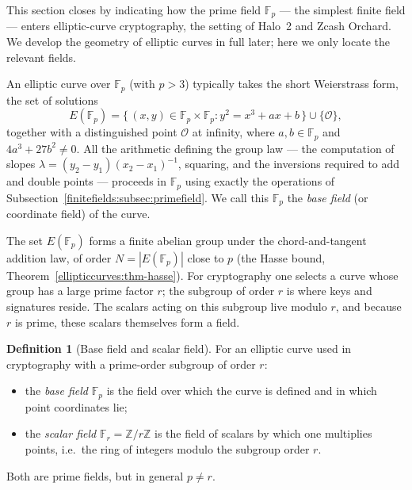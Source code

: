 \documentclass[11pt,a4paper]{article}
\theoremstyle{definition}
\newtheorem{definition}[theorem]{Definition}
\theoremstyle{remark}
\newcommand{\Z}{\ensuremath{\mathbb{Z}}}
\newcommand{\Fp}{\ensuremath{\mathbb{F}_{p}}}
\newcommand{\Fr}{\ensuremath{\mathbb{F}_{r}}}
\begin{document}
This section closes by indicating how the prime field \(\Fp\) — the simplest finite field — enters elliptic-curve cryptography, the setting of Halo~2 and Zcash Orchard. We develop the geometry of elliptic curves in full later; here we only locate the relevant fields.

An elliptic curve over \(\Fp\) (with \(p > 3\)) typically takes the short Weierstrass form, the set of solutions
\[
  E(\Fp) = \{\, (x, y) \in \Fp \times \Fp : y^2 = x^3 + ax + b \,\} \cup \{\mathcal O\},
\]
together with a distinguished point \(\mathcal O\) at infinity, where \(a, b \in \Fp\) and \(4a^3 + 27b^2 \neq 0\). All the arithmetic defining the group law — the computation of slopes \(\lambda = (y_2 - y_1)(x_2 - x_1)^{-1}\), squaring, and the inversions required to add and double points — proceeds in \(\Fp\) using exactly the operations of Subsection~\ref{finitefields:subsec:primefield}. We call this \(\Fp\) the \emph{base field} (or coordinate field) of the curve.

The set \(E(\Fp)\) forms a finite abelian group under the chord-and-tangent addition law, of order \(N = |E(\Fp)|\) close to \(p\) (the Hasse bound, Theorem~\ref{ellipticcurves:thm-hasse}). For cryptography one selects a curve whose group has a large prime factor \(r\); the subgroup of order \(r\) is where keys and signatures reside. The scalars acting on this subgroup live modulo \(r\), and because \(r\) is prime, these scalars themselves form a field.

\begin{definition}[Base field and scalar field]
\label{finitefields:def:basescalar}
For an elliptic curve used in cryptography with a prime-order subgroup of order \(r\):
\begin{itemize}
\item the \emph{base field} \(\Fp\) is the field over which the curve is defined and in which point coordinates lie;
\item the \emph{scalar field} \(\Fr = \Z/r\Z\) is the field of scalars by which one multiplies points, i.e.\ the ring of integers modulo the subgroup order \(r\).
\end{itemize}
Both are prime fields, but in general \(p \neq r\).
\end{definition}
\end{document}
